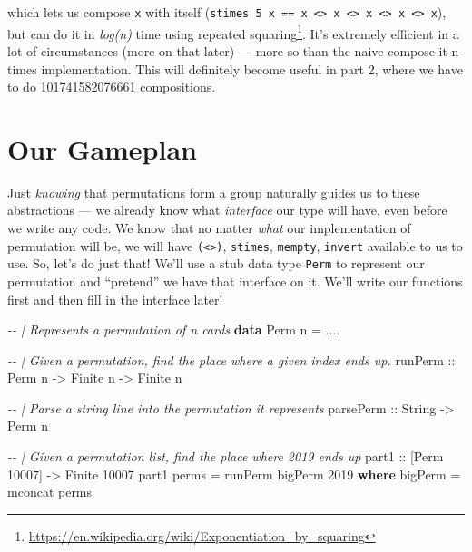 \documentclass[]{article}
\newenvironment{Shaded}{}{}
\newcommand{\CommentTok}[1]{\textcolor[rgb]{0.38,0.63,0.69}{\textit{#1}}}
\newcommand{\DataTypeTok}[1]{\textcolor[rgb]{0.56,0.13,0.00}{#1}}
\newcommand{\DecValTok}[1]{\textcolor[rgb]{0.25,0.63,0.44}{#1}}
\newcommand{\FunctionTok}[1]{\textcolor[rgb]{0.02,0.16,0.49}{#1}}
\newcommand{\KeywordTok}[1]{\textcolor[rgb]{0.00,0.44,0.13}{\textbf{#1}}}
\newcommand{\NormalTok}[1]{#1}
\newcommand{\OperatorTok}[1]{\textcolor[rgb]{0.40,0.40,0.40}{#1}}
\newcommand{\OtherTok}[1]{\textcolor[rgb]{0.00,0.44,0.13}{#1}}
\renewcommand{\href}[2]{#2\footnote{\url{#1}}}
\begin{document}
which lets us compose \texttt{x} with itself
(\texttt{stimes\ 5\ x\ ==\ x\ \textless{}\textgreater{}\ x\ \textless{}\textgreater{}\ x\ \textless{}\textgreater{}\ x\ \textless{}\textgreater{}\ x}),
but can do it in \emph{log(n)} time using
\href{https://en.wikipedia.org/wiki/Exponentiation_by_squaring}{repeated
squaring}. It's extremely efficient in a lot of circumstances (more on that
later) --- more so than the naive compose-it-n-times implementation. This will
definitely become useful in part 2, where we have to do 101741582076661
compositions.

\section{Our Gameplan}\label{our-gameplan}

Just \emph{knowing} that permutations form a group naturally guides us to these
abstractions --- we already know what \emph{interface} our type will have, even
before we write any code. We know that no matter \emph{what} our implementation
of permutation will be, we will have \texttt{(\textless{}\textgreater{})},
\texttt{stimes}, \texttt{mempty}, \texttt{invert} available to us to use. So,
let's do just that! We'll use a stub data type \texttt{Perm} to represent our
permutation and ``pretend'' we have that interface on it. We'll write our
functions first and then fill in the interface later!

\begin{Shaded}
\begin{Highlighting}[]
\CommentTok{{-}{-} | Represents a permutation of n cards}
\KeywordTok{data} \DataTypeTok{Perm}\NormalTok{ n }\OtherTok{=} \OperatorTok{....}

\CommentTok{{-}{-} | Given a permutation, find the place where a given index ends up.}
\OtherTok{runPerm ::} \DataTypeTok{Perm}\NormalTok{ n }\OtherTok{{-}\textgreater{}} \DataTypeTok{Finite}\NormalTok{ n }\OtherTok{{-}\textgreater{}} \DataTypeTok{Finite}\NormalTok{ n}

\CommentTok{{-}{-} | Parse a string line into the permutation it represents}
\OtherTok{parsePerm ::} \DataTypeTok{String} \OtherTok{{-}\textgreater{}} \DataTypeTok{Perm}\NormalTok{ n}

\CommentTok{{-}{-} | Given a permutation list, find the place where 2019 ends up}
\OtherTok{part1 ::}\NormalTok{ [}\DataTypeTok{Perm} \DecValTok{10007}\NormalTok{] }\OtherTok{{-}\textgreater{}} \DataTypeTok{Finite} \DecValTok{10007}
\NormalTok{part1 perms }\OtherTok{=}\NormalTok{ runPerm bigPerm }\DecValTok{2019}
  \KeywordTok{where}
\NormalTok{    bigPerm }\OtherTok{=} \FunctionTok{mconcat}\NormalTok{ perms}
\end{Highlighting}
\end{Shaded}
\end{document}
